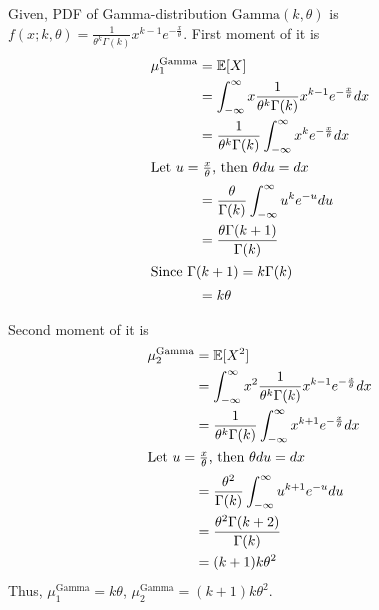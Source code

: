 \begin{solution}
	Given, PDF of Gamma-distribution $\text{Gamma}(k, \theta)$ is $f(x;k,\theta) =
		\frac{1}{\theta^k\Gamma(k)}x^{k-1}e^{-\frac{x}{\theta}}$. First moment
	of it is
	\begin{align}
		\mu_1^\text{Gamma} & = \mathbb{E}[X]                               \\
		                   & = \int_{-\infty}^\infty
		x\frac{1}{\theta^k\Gamma(k)}x^{k-1}e^{-\frac{x}{\theta}}dx
		\\
		                   & =
		\frac{1}{\theta^k\Gamma(k)}\int_{-\infty}^\infty
		x^ke^{-\frac{x}{\theta}}dx                                 \\
		\intertext{Let $u = \frac{x}{\theta}$, then $\theta du = dx$}
		                   & =
		\frac{\theta}{\Gamma(k)}\int_{-\infty}^\infty
		u^k e^{-u} du                                              \\
		                   & = \frac{\theta\Gamma(k+1)}{\Gamma(k)}
		\\
		\intertext{Since $\Gamma(k+1)=k\Gamma(k)$}
		                   & = k\theta
	\end{align}

	Second moment of it is
	\begin{align}
		\mu_2^\text{Gamma} & = \mathbb{E}[X^2]                               \\
		                   & = \int_{-\infty}^\infty
		x^2\frac{1}{\theta^k\Gamma(k)}x^{k-1}e^{-\frac{x}{\theta}}dx
		\\
		                   & =
		\frac{1}{\theta^k\Gamma(k)}\int_{-\infty}^\infty
		x^{k+1}e^{-\frac{x}{\theta}}dx                               \\
		\intertext{Let $u = \frac{x}{\theta}$, then $\theta du = dx$}
		                   & =
		\frac{\theta^2}{\Gamma(k)}\int_{-\infty}^\infty
		u^{k+1}e^{-u} du                                             \\
		                   & = \frac{\theta^2\Gamma(k+2)}{\Gamma(k)}
		\\
		                   & = (k+1)k\theta^2
	\end{align}
	Thus, $\mu_1^\text{Gamma} = k\theta$, $\mu_2^\text{Gamma} = (k+1)k\theta^2$.
\end{solution}
